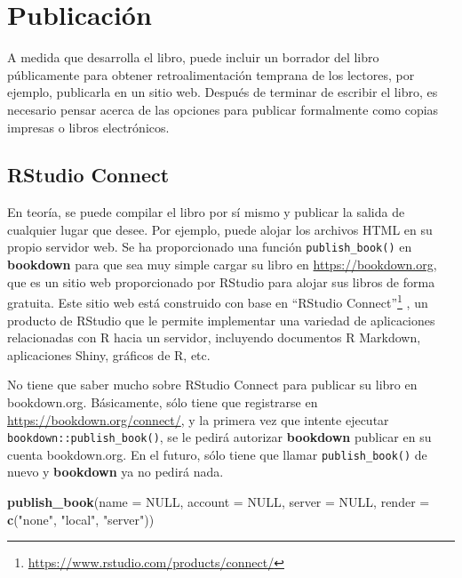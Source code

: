 \documentclass[12pt,]{krantz}
\makeatletter
\newenvironment{Shaded}{\begin{snugshade}}{\end{snugshade}}
\newcommand{\KeywordTok}[1]{\textcolor[rgb]{0.13,0.29,0.53}{\textbf{#1}}}
\newcommand{\DataTypeTok}[1]{\textcolor[rgb]{0.13,0.29,0.53}{#1}}
\newcommand{\StringTok}[1]{\textcolor[rgb]{0.31,0.60,0.02}{#1}}
\newcommand{\OtherTok}[1]{\textcolor[rgb]{0.56,0.35,0.01}{#1}}
\newcommand{\NormalTok}[1]{#1}
\renewcommand{\href}[2]{#2\footnote{\url{#1}}}
\newenvironment{kframe}{%
\medskip{}
\setlength{\fboxsep}{.8em}
 \def\at@end@of@kframe{}%
 \ifinner\ifhmode%
  \def\at@end@of@kframe{\end{minipage}}%
  \begin{minipage}{\columnwidth}%
 \fi\fi%
 \def\FrameCommand##1{\hskip\@totalleftmargin \hskip-\fboxsep
 \colorbox{shadecolor}{##1}\hskip-\fboxsep
     \hskip-\linewidth \hskip-\@totalleftmargin \hskip\columnwidth}%
 \MakeFramed {\advance\hsize-\width
   \@totalleftmargin\z@ \linewidth\hsize
   \@setminipage}}%
 {\par\unskip\endMakeFramed%
 \at@end@of@kframe}
\renewenvironment{Shaded}{\begin{kframe}}{\end{kframe}}
\theoremstyle{definition}
\theoremstyle{definition}
\theoremstyle{definition}
\theoremstyle{remark}
\makeatother
\begin{document}
\chapter{Publicación}\label{publicacion}

A medida que desarrolla el libro, puede incluir un borrador del libro
públicamente para obtener retroalimentación temprana de los lectores,
por ejemplo, publicarla en un sitio web. Después de terminar de escribir
el libro, es necesario pensar acerca de las opciones para publicar
formalmente como copias impresas o libros electrónicos.

\section{RStudio Connect}\label{rstudio-connect}

En teoría, se puede compilar el libro por sí mismo y publicar la salida
de cualquier lugar que desee. Por ejemplo, puede alojar los archivos
HTML en su propio servidor web. Se ha proporcionado una función
\texttt{publish\_book()} en \textbf{bookdown} para que sea muy simple
cargar su libro en \url{https://bookdown.org}, que es un sitio web
proporcionado por RStudio para alojar sus libros de forma gratuita.
 Este sitio web está construido con base en
\href{https://www.rstudio.com/products/connect/}{``RStudio Connect''}
, un producto de RStudio que le permite
implementar una variedad de aplicaciones relacionadas con R hacia un
servidor, incluyendo documentos R Markdown, aplicaciones Shiny, gráficos
de R, etc.

No tiene que saber mucho sobre RStudio Connect para publicar su libro en
bookdown.org. Básicamente, sólo tiene que registrarse en
\url{https://bookdown.org/connect/}, y la primera vez que intente
ejecutar
\texttt{bookdown::publish\_book()}, se
le pedirá autorizar \textbf{bookdown} publicar en su cuenta
bookdown.org. En el futuro, sólo tiene que llamar
\texttt{publish\_book()} de nuevo y \textbf{bookdown} ya no pedirá nada.

\begin{Shaded}
\begin{Highlighting}[]
\KeywordTok{publish_book}\NormalTok{(}\DataTypeTok{name =} \OtherTok{NULL}\NormalTok{, }\DataTypeTok{account =} \OtherTok{NULL}\NormalTok{,}
  \DataTypeTok{server =} \OtherTok{NULL}\NormalTok{, }\DataTypeTok{render =} \KeywordTok{c}\NormalTok{(}\StringTok{"none"}\NormalTok{, }\StringTok{"local"}\NormalTok{, }\StringTok{"server"}\NormalTok{))}
\end{Highlighting}
\end{Shaded}
\end{document}
